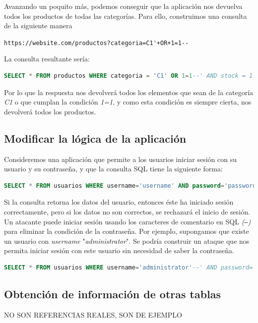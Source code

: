 \documentclass[bibliography=totocnumbered]{scrartcl}
\begin{document}
Avanzando un poquito más, podemos conseguir que la aplicación nos devuelva todos los productos de todas las categorías. Para ello, construimos una consulta de la siguiente manera
\begin{center}
\nolinkurl{https://website.com/productos?categoria=C1'+OR+1=1--}
\end{center}
La consulta resultante sería:
\begin{lstlisting}[language=SQL]
  SELECT * FROM productos WHERE categoria = 'C1' OR 1=1--' AND stock = 1
\end{lstlisting}
Por lo que la respuesta nos devolverá todos los elementos que sean de la categoría \textit{C1} o que cumplan la condición \textit{1=1}, y como esta condición es siempre cierta, nos devolverá todos los productos.\\

\subsection{Modificar la lógica de la aplicación}
Consideremos una aplicación que permite a los usuarios iniciar sesión con su usuario y su contraseña, y que la consulta SQL tiene la siguiente forma:
\begin{lstlisting}[language=SQL]
 SELECT * FROM usuarios WHERE username='username' AND password='password'
\end{lstlisting}
Si la consulta retorna los datos del usuario, entonces éste ha iniciado sesión correctamente, pero si los datos no son correctos, se rechazará el inicio de sesión.\\

Un atacante puede iniciar sesión usando los caracteres de comentario en SQL \textit{(\texttt{--})} para eliminar la condición de la contraseña. Por ejemplo, supongamos que existe un usuario con \textit{username} "\textit{administrator}". Se podría construir un ataque que nos permita iniciar sesión con este usuario sin necesidad de saber la contraseña.
\begin{lstlisting}[language=SQL]
 SELECT * FROM usuarios WHERE username='administrator'--' AND password=''
\end{lstlisting}

\subsection{Obtención de información de otras tablas}



\newpage
NO SON REFERENCIAS REALES, SON DE EJEMPLO
\nocite{*}


\end{document}
